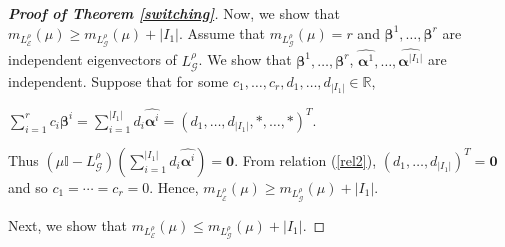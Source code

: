 \documentclass{amsart}
\theoremstyle{remark}
\begin{document}
\begin{proof}[\textbf{Proof of Theorem \ref{switching}}]
Now, we show that $m_{L_{\mathcal{E}}^{\rho}}(\mu)\geq m_{L_{\mathcal{G}}^{\rho}}(\mu)+|I_{1}|$.
Assume that $m_{L_{\mathcal{G}}^{\rho}}(\mu)=r$ and $\pmb{\beta}^{1},\ldots,\pmb{\beta}^{r}$ are independent eigenvectors of $L_{\mathcal{G}}^{\rho}$. We show that $\pmb{\beta}^{1},\ldots,\pmb{\beta}^{r}$, $\widehat{\pmb{\alpha}^{1}},\ldots,\widehat{\pmb{\alpha}^{|I_{1}|}}$ are independent. Suppose that for some $c_{1},\ldots,c_{r},d_{1},\ldots,d_{|I_{1}|}\in\mathbb{R}$,
\begin{center}
$\sum_{i=1}^{r}c_{i}\pmb{\beta}^{i}=\sum_{i=1}^{|I_{1}|}d_{i}\widehat{\pmb{\alpha}^{i}}=(d_{1},\ldots,d_{|I_{1}|},\ast,\ldots,\ast)^{T}.$
\end{center}

Thus $(\mu\mathbb{I}-L_{\mathcal{G}}^{\rho})(\sum_{i=1}^{|I_{1}|}d_{i}\widehat{\pmb{\alpha}^{i}})=\pmb{0}$. From relation (\ref{rel2}),
$(d_{1},\ldots,d_{|I_{1}|})^{T}=\pmb{0}$ and so $c_{1}=\cdots=c_{r}=0$. Hence, $m_{L_{\mathcal{E}}^{\rho}}(\mu)\geq m_{L_{\mathcal{G}}^{\rho}}(\mu)+|I_{1}|$.

Next, we show that $m_{L_{\mathcal{E}}^{\rho}}(\mu)\leq m_{L_{\mathcal{G}}^{\rho}}(\mu)+|I_{1}|$.


\end{proof}
\end{document}
